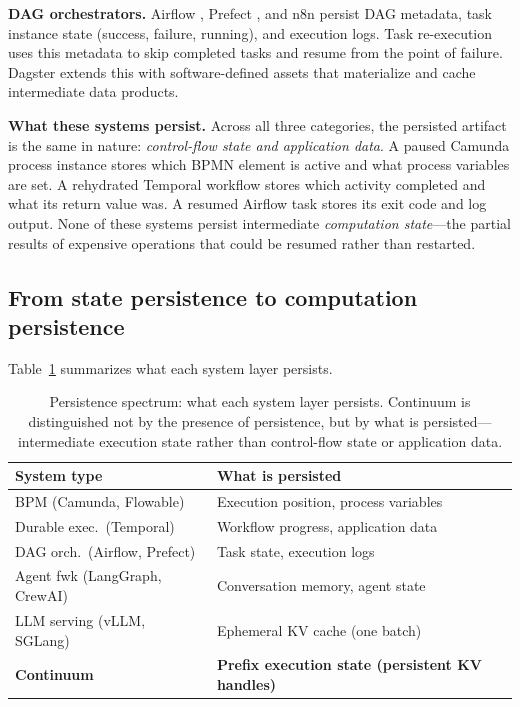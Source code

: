 \documentclass[10pt,twocolumn]{article}
\begin{document}
\textbf{DAG orchestrators.}
Airflow \cite{apache2024airflow}, Prefect \cite{prefect2024docs}, and n8n \cite{n8n2024docs} persist DAG metadata, task instance state (success, failure, running), and execution logs. Task re-execution uses this metadata to skip completed tasks and resume from the point of failure. Dagster \cite{radul2019dagster} extends this with software-defined assets that materialize and cache intermediate data products.

\textbf{What these systems persist.}
Across all three categories, the persisted artifact is the same in nature: \emph{control-flow state and application data}. A paused Camunda process instance stores which BPMN element is active and what process variables are set. A rehydrated Temporal workflow stores which activity completed and what its return value was. A resumed Airflow task stores its exit code and log output. None of these systems persist intermediate \emph{computation state}---the partial results of expensive operations that could be resumed rather than restarted.

\subsection{From state persistence to computation persistence}

Table~\ref{tab:persistence-spectrum} summarizes what each system layer persists.

\begin{table}[t]
\centering
{\small
\caption{Persistence spectrum: what each system layer persists. Continuum is distinguished not by the presence of persistence, but by what is persisted---intermediate execution state rather than control-flow state or application data.}
\label{tab:persistence-spectrum}
\begin{tabular}{@{}ll@{}}
\toprule
\textbf{System type} & \textbf{What is persisted} \\
\midrule
BPM (Camunda, Flowable) & Execution position, process variables \\
Durable exec.\ (Temporal) & Workflow progress, application data \\
DAG orch.\ (Airflow, Prefect) & Task state, execution logs \\
Agent fwk (LangGraph, CrewAI) & Conversation memory, agent state \\
LLM serving (vLLM, SGLang) & Ephemeral KV cache (one batch) \\
\midrule
\textbf{Continuum} & \textbf{Prefix execution state (persistent KV handles)} \\
\bottomrule
\end{tabular}
}
\end{table}
\end{document}
